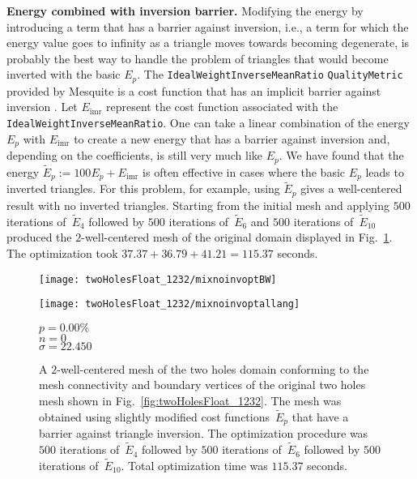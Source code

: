 \documentclass[final]{siamltex}
\begin{document}
{\bf{Energy combined with inversion barrier.}}  Modifying the energy
by introducing a term that has a barrier against inversion, i.e., a
term for which the energy value goes to infinity as a triangle moves
towards becoming degenerate, is probably the best way to handle the
problem of triangles that would become inverted with the basic $E_{p}$.
The {\texttt{IdealWeightInverseMeanRatio}} {\texttt{QualityMetric}}
provided by Mesquite is a cost function that has an implicit barrier
against inversion \cite{Munson2007}.  Let $E_{\text{imr}}$ represent
the cost function associated with the
{\texttt{IdealWeightInverseMeanRatio}}.  One can take a linear
combination of the energy $E_{p}$ with $E_{\text{imr}}$ to
create a new energy that has a barrier against inversion and,
depending on the coefficients, is still very much like $E_{p}$.
We have found that the energy
$\widetilde{E}_{p} := 100E_{p} + E_{\text{imr}}$ is often
effective in cases where the basic $E_{p}$ leads to inverted
triangles.  For this problem, for example, using $\widetilde{E}_{p}$
gives a well-centered result with no inverted triangles.  
Starting from the initial mesh and applying $500$ iterations
of~$\widetilde{E}_{4}$ followed by $500$ iterations
of~$\widetilde{E}_{6}$ and $500$ iterations of~$\widetilde{E}_{10}$
produced the $2$-well-centered mesh of the original domain displayed
in Fig.~\ref{fig:twoHolesFloat_1232_wct}.  The optimization took
$37.37 + 36.79 + 41.21 = 115.37$ seconds.

\begin{figure}
  \centering
  \begin{minipage}[c]{135pt}
    \texttt{[image: twoHolesFloat\_1232/mixnoinvoptBW]}\end{minipage}\hspace{20pt}\begin{minipage}[c]{90pt}
    \texttt{[image: twoHolesFloat\_1232/mixnoinvoptallang]}\end{minipage}\hspace{5pt}
  \begin{minipage}[c]{50pt}
    \centering
    {\small $p = 0.00\%$\\
    $n = 0$\\
    $\sigma = 22.450$}
  \end{minipage}
  \caption{A $2$-well-centered mesh of the two holes domain conforming
    to the mesh connectivity and boundary vertices of the original two
    holes mesh shown in Fig.~\ref{fig:twoHolesFloat_1232}.  The mesh
    was obtained using slightly modified cost
    functions~$\widetilde{E}_{p}$ that have a barrier against triangle
    inversion.  The optimization procedure was $500$ iterations
    of~$\widetilde{E}_{4}$ followed by $500$ iterations
    of~$\widetilde{E}_{6}$ followed by $500$ iterations
    of~$\widetilde{E}_{10}$.  Total optimization time was $115.37$
    seconds.}
  \label{fig:twoHolesFloat_1232_wct}
\end{figure}
\end{document}
